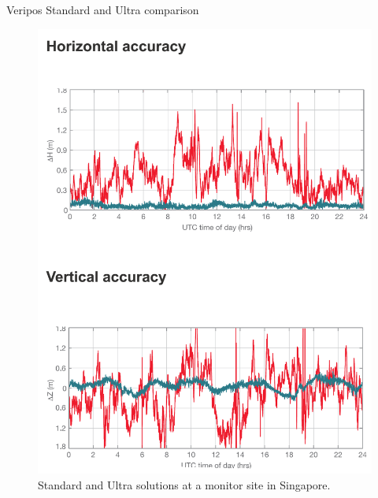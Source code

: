 \documentclass[11pt]{beamer}
\begin{document}
\begin{frame}{Veripos Standard and Ultra comparison}
		\begin{figure}[T]
			\vspace*{-1cm}
			\includegraphics[height=.85\textheight]{pic/Ultra.png}
			\caption{Standard and Ultra solutions at a monitor site in Singapore.}
		\end{figure}
\end{frame}
\end{document}
